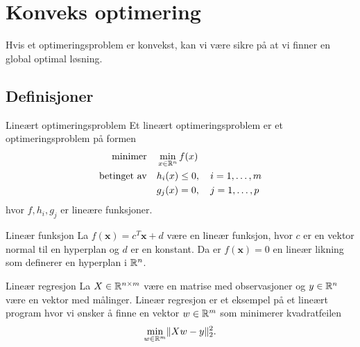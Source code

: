 
\chapter{Konveks optimering}

Hvis et optimeringsproblem er konvekst, kan vi være sikre på at vi finner en global optimal løsning.

\section*{Definisjoner}

\begin{definition}{Lineært optimeringsproblem}{}
  Et lineært optimeringsproblem er et optimeringsproblem på formen
  \begin{align*}
    \text{minimer}     & \quad \min_{x \in \mathbb{R}^n} f(x)                \\
    \text{betinget av} & \quad h_i(x) \leq 0, \quad i = 1, \ldots, m \\
                       & \quad g_j(x) = 0, \quad j = 1, \ldots, p
  \end{align*}
  hvor \(f, h_i, g_j\) er lineære funksjoner.
\end{definition}

\begin{example}{Lineær funksjon}{}
  La \(f(\symbf{x}) = c^T\symbf{x} + d\) være en lineær funksjon, hvor \(c\) er en vektor normal til en hyperplan og \(d\) er en konstant.
  Da er \(f(\symbf{x}) = 0\) en lineær likning som definerer en hyperplan i \(\mathbb{R}^n\).
\end{example}

\begin{example}{Lineær regresjon}{}
  La \(X \in \mathbb{R}^{n \times m}\) være en matrise med observasjoner og \(y \in \mathbb{R}^n\) være en vektor med målinger.
  Lineær regresjon er et eksempel på et lineært program hvor vi ønsker å finne en vektor \(w \in \mathbb{R}^m\) som minimerer kvadratfeilen
  \begin{equation*}
    \min_{w \in \mathbb{R}^m} \lVert Xw - y\rVert_2^2.
  \end{equation*}
\end{example}
